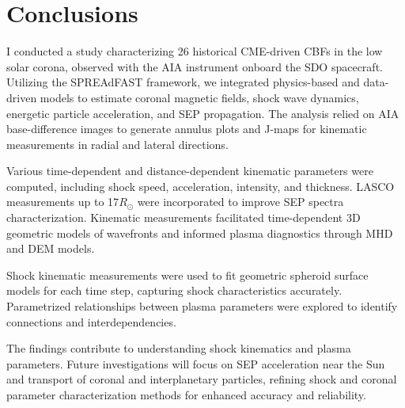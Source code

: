 \section{Conclusions}
I conducted a study characterizing 26 historical CME-driven CBFs in the low solar corona, observed with the AIA instrument onboard the SDO spacecraft. Utilizing the SPREAdFAST framework, we integrated physics-based and data-driven models to estimate coronal magnetic fields, shock wave dynamics, energetic particle acceleration, and SEP propagation. The analysis relied on AIA base-difference images to generate annulus plots and J-maps for kinematic measurements in radial and lateral directions.

Various time-dependent and distance-dependent kinematic parameters were computed, including shock speed, acceleration, intensity, and thickness. LASCO measurements up to 17$R_{\odot}$ were incorporated to improve SEP spectra characterization. Kinematic measurements facilitated time-dependent 3D geometric models of wavefronts and informed plasma diagnostics through MHD and DEM models.

Shock kinematic measurements were used to fit geometric spheroid surface models for each time step, capturing shock characteristics accurately. Parametrized relationships between plasma parameters were explored to identify connections and interdependencies.

The findings contribute to understanding shock kinematics and plasma parameters. Future investigations will focus on SEP acceleration near the Sun and transport of coronal and interplanetary particles, refining shock and coronal parameter characterization methods for enhanced accuracy and reliability.